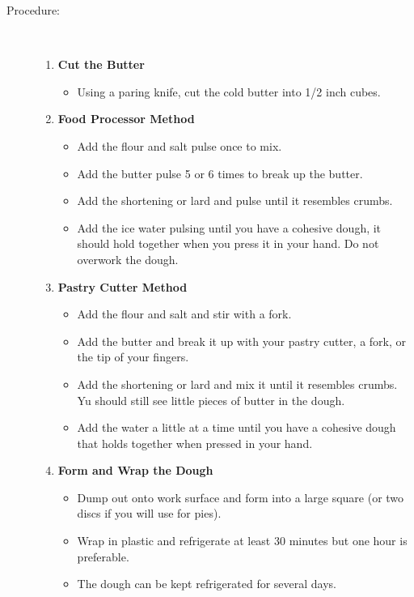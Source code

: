 \documentclass[11pt,letterpaper]{article}
\begin{document}
\begin{description}
\item[Procedure:]\ \\
	\begin{enumerate}
	\item {\bf Cut the Butter}
	\begin{itemize}
	\item Using a paring knife, cut the cold butter into 1/2 inch cubes.
	\end{itemize}
	\item {\bf Food Processor Method}
	\begin{itemize}
	\item Add the flour and salt pulse once to mix.
	\item Add the butter pulse 5 or 6 times to break up the butter.
	\item Add the shortening or lard and pulse until it resembles crumbs.
	\item Add the ice water pulsing until you have a cohesive dough, it should hold together when you press it in your hand. Do not overwork the dough.
	\end{itemize}
	\item {\bf Pastry Cutter Method}
	\begin{itemize}
	\item Add the flour and salt and stir with a fork.
	\item Add the butter and break it up with your pastry cutter, a fork, or the tip of your fingers.
	\item Add the shortening or lard and mix it until it resembles crumbs. Yu should still see little pieces of butter in the dough.
	\item Add the water a little at a time until you have a cohesive dough that holds together when pressed in your hand. 
	\end{itemize}
	\item {\bf Form and Wrap the Dough}
	\begin{itemize}
	\item Dump out onto work surface and form into a large square (or two discs if you will use for pies). 
	\item Wrap in plastic and refrigerate at least 30 minutes but one hour is preferable. 
	\item The dough can be kept refrigerated for several days.	
	\end{itemize}
	\end{enumerate}
\end{description}
\end{document}
